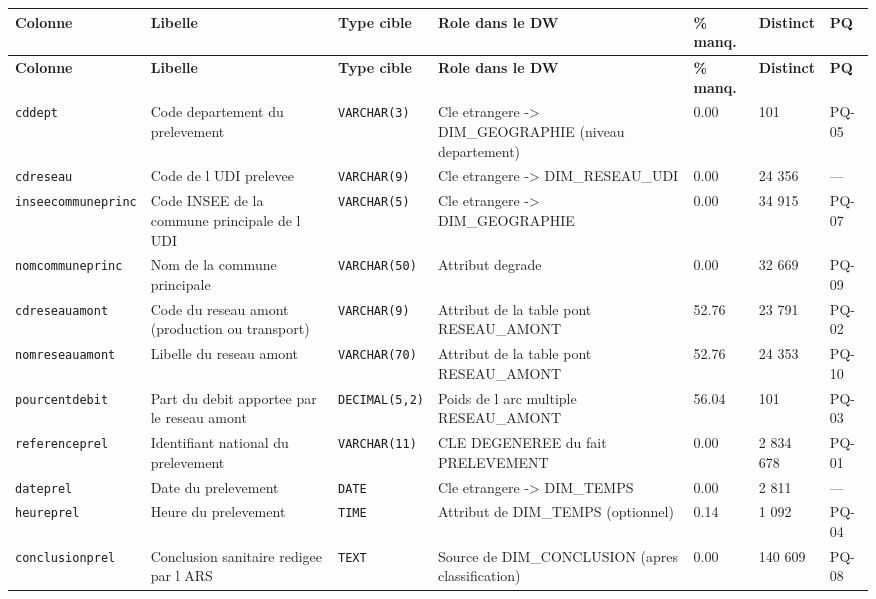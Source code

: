 {\footnotesize\setlength{\tabcolsep}{3pt}
\begin{longtable}{@{}p{2.6cm}p{3.5cm}p{1.9cm}p{3.1cm}p{1.1cm}p{1.3cm}p{0.9cm}@{}}
\toprule
\textbf{Colonne} & \textbf{Libelle} & \textbf{Type cible} & \textbf{Role dans le DW} & \textbf{\% manq.} & \textbf{Distinct} & \textbf{PQ} \\
\midrule \endfirsthead
\toprule \textbf{Colonne} & \textbf{Libelle} & \textbf{Type cible} & \textbf{Role dans le DW} & \textbf{\% manq.} & \textbf{Distinct} & \textbf{PQ} \\ \midrule \endhead
\bottomrule \endfoot
\texttt{cddept} & Code departement du prelevement & \texttt{VARCHAR(3)} & Cle etrangere -> DIM\_GEOGRAPHIE (niveau departement) & 0.00 & 101 & PQ-05 \\
\texttt{cdreseau} & Code de l UDI prelevee & \texttt{VARCHAR(9)} & Cle etrangere -> DIM\_RESEAU\_UDI & 0.00 & 24 356 & --- \\
\texttt{inseecommuneprinc} & Code INSEE de la commune principale de l UDI & \texttt{VARCHAR(5)} & Cle etrangere -> DIM\_GEOGRAPHIE & 0.00 & 34 915 & PQ-07 \\
\texttt{nomcommuneprinc} & Nom de la commune principale & \texttt{VARCHAR(50)} & Attribut degrade & 0.00 & 32 669 & PQ-09 \\
\texttt{cdreseauamont} & Code du reseau amont (production ou transport) & \texttt{VARCHAR(9)} & Attribut de la table pont RESEAU\_AMONT & 52.76 & 23 791 & PQ-02 \\
\texttt{nomreseauamont} & Libelle du reseau amont & \texttt{VARCHAR(70)} & Attribut de la table pont RESEAU\_AMONT & 52.76 & 24 353 & PQ-10 \\
\texttt{pourcentdebit} & Part du debit apportee par le reseau amont & \texttt{DECIMAL(5,2)} & Poids de l arc multiple RESEAU\_AMONT & 56.04 & 101 & PQ-03 \\
\texttt{referenceprel} & Identifiant national du prelevement & \texttt{VARCHAR(11)} & CLE DEGENEREE du fait PRELEVEMENT & 0.00 & 2 834 678 & PQ-01 \\
\texttt{dateprel} & Date du prelevement & \texttt{DATE} & Cle etrangere -> DIM\_TEMPS & 0.00 & 2 811 & --- \\
\texttt{heureprel} & Heure du prelevement & \texttt{TIME} & Attribut de DIM\_TEMPS (optionnel) & 0.14 & 1 092 & PQ-04 \\
\texttt{conclusionprel} & Conclusion sanitaire redigee par l ARS & \texttt{TEXT} & Source de DIM\_CONCLUSION (apres classification) & 0.00 & 140 609 & PQ-08 \\

\end{longtable}}
